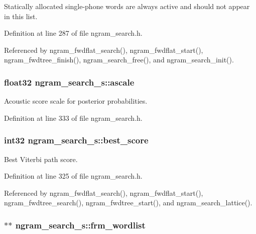 Statically allocated single-\/phone words are always active and should not appear in this list. 

Definition at line 287 of file ngram\-\_\-search.\-h.



Referenced by ngram\-\_\-fwdflat\-\_\-search(), ngram\-\_\-fwdflat\-\_\-start(), ngram\-\_\-fwdtree\-\_\-finish(), ngram\-\_\-search\-\_\-free(), and ngram\-\_\-search\-\_\-init().

\subsubsection[{ascale}]{\setlength{\rightskip}{0pt plus 5cm}float32 ngram\-\_\-search\-\_\-s\-::ascale}\label{structngram__search__s_a1e3d4b67e4b11c6c11ebe16552d53d2d}


Acoustic score scale for posterior probabilities. 



Definition at line 333 of file ngram\-\_\-search.\-h.

\subsubsection[{best\-\_\-score}]{\setlength{\rightskip}{0pt plus 5cm}int32 ngram\-\_\-search\-\_\-s\-::best\-\_\-score}\label{structngram__search__s_a150d99157e2f37a6f0dbb4b02682d9c3}


Best Viterbi path score. 



Definition at line 325 of file ngram\-\_\-search.\-h.



Referenced by ngram\-\_\-fwdflat\-\_\-search(), ngram\-\_\-fwdflat\-\_\-start(), ngram\-\_\-fwdtree\-\_\-search(), ngram\-\_\-fwdtree\-\_\-start(), and ngram\-\_\-search\-\_\-lattice().

\subsubsection[{frm\-\_\-wordlist}]{$\ast$$\ast$ ngram\-\_\-search\-\_\-s\-::frm\-\_\-wordlist}\label{structngram__search__s_aa54544457c363ccccb87fc7ec63a5f3e}


